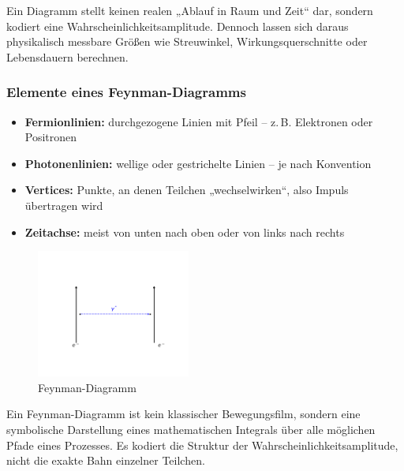 Ein Diagramm stellt keinen realen „Ablauf in Raum und Zeit“ dar, sondern kodiert eine Wahrscheinlichkeitsamplitude. Dennoch lassen sich daraus physikalisch messbare Größen wie Streuwinkel, Wirkungsquerschnitte oder Lebensdauern berechnen.

\subsubsection*{Elemente eines Feynman-Diagramms}
\begin{itemize}
	\item \textbf{Fermionlinien:} durchgezogene Linien mit Pfeil – z.\,B. Elektronen oder Positronen
	\item \textbf{Photonenlinien:} wellige oder gestrichelte Linien – je nach Konvention
	\item \textbf{Vertices:} Punkte, an denen Teilchen „wechselwirken“, also Impuls übertragen wird
	\item \textbf{Zeitachse:} meist von unten nach oben oder von links nach rechts
\end{itemize}
\begin{figure}[H]
	\begin{center}
		\includegraphics[width=0.45\textwidth]{bilder/feynman-einphoton.pdf}
	\end{center}
	\caption{Feynman-Diagramm}
\end{figure}

\vspace{0.5em}
\begin{tcolorbox}[physikbox, title=Was ein Feynman-Diagramm wirklich zeigt]
	\label{box:Was ein Feynman-Diagramm}
	Ein Feynman-Diagramm ist kein klassischer Bewegungsfilm, sondern eine symbolische Darstellung eines mathematischen Integrals über alle möglichen Pfade eines Prozesses. Es kodiert die Struktur der Wahrscheinlichkeitsamplitude, nicht die exakte Bahn einzelner Teilchen.
\end{tcolorbox}

